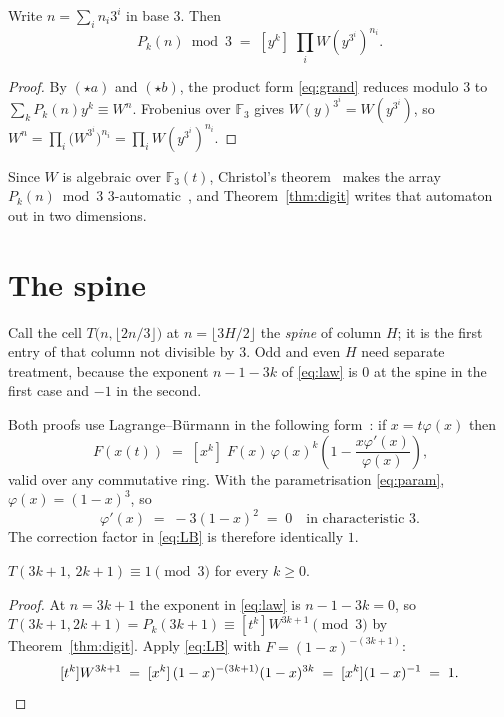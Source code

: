 \documentclass[11pt]{article}
\newcommand{\F}{\mathbb{F}}
\begin{document}
\begin{theorem}
\label{thm:digit}
Write $n = \sum_i n_i 3^i$ in base $3$. Then
\[
  P_k(n) \bmod 3 \;=\; [y^k]\;\prod_i W\!\left(y^{3^i}\right)^{n_i}.
\]
\end{theorem}

\begin{proof}
By $(\star a)$ and $(\star b)$, the product form \eqref{eq:grand} reduces modulo
$3$ to $\sum_k P_k(n)y^k \equiv W^n$. Frobenius over $\F_3$ gives
$W(y)^{3^i} = W(y^{3^i})$, so $W^n = \prod_i \bigl(W^{3^i}\bigr)^{n_i} =
\prod_i W(y^{3^i})^{n_i}$.
\end{proof}

Since $W$ is algebraic over $\F_3(t)$, Christol's
theorem~\cite{christol1980} makes the array $P_k(n) \bmod 3$
$3$-automatic~\cite{allouche2003}, and Theorem~\ref{thm:digit} writes that
automaton out in two dimensions.

\section{The spine}

Call the cell $T\bigl(n, \lfloor 2n/3 \rfloor\bigr)$ at
$n = \lfloor 3H/2\rfloor$ the \emph{spine} of column $H$; it is the first entry
of that column not divisible by $3$. Odd and even $H$ need separate treatment,
because the exponent $n-1-3k$ of \eqref{eq:law} is $0$ at the spine in the first
case and $-1$ in the second.

Both proofs use Lagrange--B\"urmann in the following form~\cite[Ch.~5]{stanley2012}:
if $x = t\varphi(x)$ then
\begin{equation}
  [t^k]\,F(x(t)) \;=\; [x^k]\;F(x)\,\varphi(x)^k
  \left(1 - \frac{x\varphi'(x)}{\varphi(x)}\right),
  \label{eq:LB}
\end{equation}
valid over any commutative ring. With the parametrisation \eqref{eq:param},
$\varphi(x) = (1-x)^3$, so
\[
  \varphi'(x) \;=\; -3(1-x)^2 \;=\; 0 \quad\text{in characteristic } 3 .
\]
The correction factor in \eqref{eq:LB} is therefore identically $1$.

\begin{theorem}
\label{thm:oddspine}
$T(3k+1,\,2k+1) \equiv 1 \pmod 3$ for every $k \ge 0$.
\end{theorem}

\begin{proof}
At $n = 3k+1$ the exponent in \eqref{eq:law} is $n-1-3k = 0$, so
$T(3k+1,2k+1) = P_k(3k+1) \equiv [t^k]W^{3k+1} \pmod 3$ by
Theorem~\ref{thm:digit}. Apply \eqref{eq:LB} with $F = (1-x)^{-(3k+1)}$:
\[
  [t^k]W^{3k+1} \;=\; [x^k]\,(1-x)^{-(3k+1)}(1-x)^{3k}
  \;=\; [x^k](1-x)^{-1} \;=\; 1 .
  \qedhere
\]
\end{proof}
\end{document}
